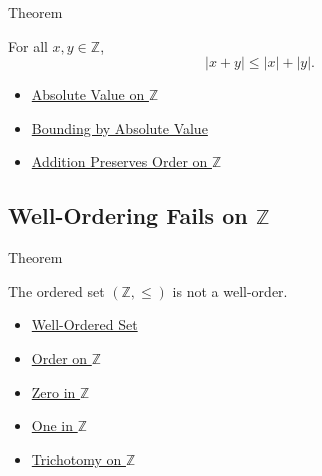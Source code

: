 \begin{theorembox}{Theorem}
\begin{theorem}
\label{thm:triangle-inequality-on-z}
For all $x,y\in\mathbb{Z}$,
\[
|x+y|\le |x|+|y|.
\]
\end{theorem}
\end{theorembox}

\begin{dependencies}
\begin{itemize}
  \item \hyperref[def:absolute-value-on-z]{Absolute Value on $\mathbb{Z}$}
  \item \hyperref[thm:absolute-value-bounds-on-z]{Bounding by Absolute Value}
  \item \hyperref[thm:addition-preserves-order-on-z]{Addition Preserves Order on $\mathbb{Z}$}
\end{itemize}
\end{dependencies}

\subsection*{\texorpdfstring{Well-Ordering Fails on $\mathbb{Z}$}{Well-Ordering Fails on Z}}

\begin{theorembox}{Theorem}
\begin{theorem}
\label{thm:z-is-not-well-ordered}
The ordered set $(\mathbb{Z},\le)$ is not a well-order.
\end{theorem}
\end{theorembox}

\begin{dependencies}
\begin{itemize}
  \item \hyperref[def:well-order]{Well-Ordered Set}
  \item \hyperref[def:order-on-z]{Order on $\mathbb{Z}$}
  \item \hyperref[def:zero-in-z]{Zero in $\mathbb{Z}$}
  \item \hyperref[def:one-in-z]{One in $\mathbb{Z}$}
  \item \hyperref[thm:trichotomy-on-z]{Trichotomy on $\mathbb{Z}$}
\end{itemize}
\end{dependencies}
